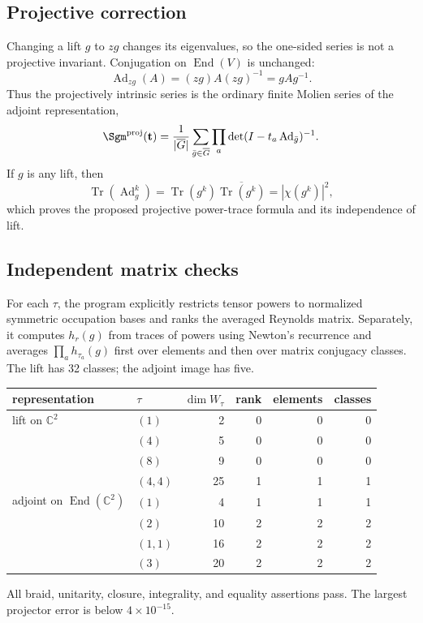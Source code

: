\documentclass[10pt]{article}
\begin{document}
\subsection{Projective correction}
Changing a lift $g$ to $zg$ changes its eigenvalues, so the one-sided series
is not a projective invariant.  Conjugation on $\operatorname{End}(V)$ is
unchanged:
\[
 \operatorname{Ad}_{zg}(A)=(zg)A(zg)^{-1}=gAg^{-1}.
\]
Thus the projectively intrinsic series is the ordinary finite Molien series
of the adjoint representation,
\[
 \Sgm^{\mathrm{proj}}(\mathbf t)=\frac1{|\overline G|}
 \sum_{\bar g\in\overline G}\prod_a
 \det(I-t_a\operatorname{Ad}_{\bar g})^{-1}.
\]
If $g$ is any lift, then
\[
 \operatorname{Tr}(\operatorname{Ad}_{g}^{k})
 =\operatorname{Tr}(g^k)\overline{\operatorname{Tr}(g^k)}
 =|\chi(g^k)|^2,
\]
which proves the proposed projective power-trace formula and its independence
of lift.

\subsection{Independent matrix checks}
For each $\tau$, the program explicitly restricts tensor powers to normalized
symmetric occupation bases and ranks the averaged Reynolds matrix.  Separately,
it computes $h_r(g)$ from traces of powers using Newton's recurrence and
averages $\prod_a h_{\tau_a}(g)$ first over elements and then over matrix
conjugacy classes.  The lift has 32 classes; the adjoint image has five.

\begin{center}
\begin{tabular}{@{}llrrrr@{}}\toprule
representation&$\tau$&$\dim W_\tau$&rank&elements&classes\\\midrule
lift on $\mathbb C^2$&$(1)$&2&0&0&0\\
&$(4)$&5&0&0&0\\
&$(8)$&9&0&0&0\\
&$(4,4)$&25&1&1&1\\\addlinespace
adjoint on $\operatorname{End}(\mathbb C^2)$&$(1)$&4&1&1&1\\
&$(2)$&10&2&2&2\\
&$(1,1)$&16&2&2&2\\
&$(3)$&20&2&2&2\\\bottomrule
\end{tabular}
\end{center}
All braid, unitarity, closure, integrality, and equality assertions pass.  The
largest projector error is below $4\times10^{-15}$.
\end{document}
